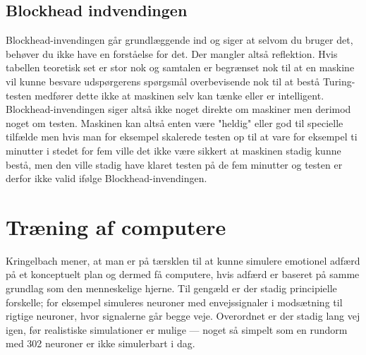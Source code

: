 \documentclass{article}
\begin{document}
\subsection{Blockhead indvendingen}

Blockhead-invendingen går grundlæggende ind og siger at selvom du bruger det, behøver du ikke have en forståelse for det. Der mangler altså reflektion.
Hvis tabellen teoretisk set er stor nok og samtalen er begrænset nok til at en maskine vil kunne besvare udspørgerens spørgsmål overbevisende nok til at bestå Turing-testen medfører dette ikke at maskinen selv kan tænke eller er intelligent.
Blockhead-invendingen siger altså ikke noget direkte om maskiner men derimod noget om testen.
Maskinen kan altså enten være "heldig" eller god til specielle tilfælde men hvis man for eksempel skalerede testen op til at vare for eksempel ti minutter i stedet for fem ville det ikke være sikkert at maskinen stadig kunne bestå, men den ville stadig have klaret testen på de fem minutter og testen er derfor ikke valid ifølge Blockhead-invendingen.

\section{Træning af computere}
Kringelbach mener, at man er på tærsklen til at kunne simulere emotionel adfærd på et konceptuelt plan og dermed få computere, hvis adfærd er baseret på samme grundlag som den menneskelige hjerne. Til gengæld er der stadig principielle forskelle; for eksempel simuleres neuroner med envejssignaler i modsætning til rigtige neuroner, hvor signalerne går begge veje. Overordnet er der stadig lang vej igen, før realistiske simulationer er mulige --- noget så simpelt som en rundorm med 302 neuroner er ikke simulerbart i dag.
\end{document}
